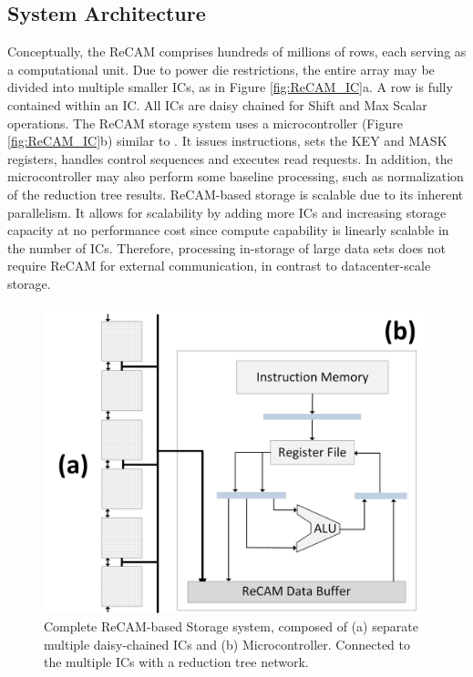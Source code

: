 \documentclass{superfri}
\begin{document}
\subsection{System Architecture}
\label{sec:system_architecture}
Conceptually, the ReCAM comprises hundreds of millions of rows, each serving as a computational unit. Due to power die restrictions, the entire array may be divided into multiple smaller ICs, as in Figure \ref{fig:ReCAM_IC}a. A row is fully contained within an IC. All ICs are daisy chained for Shift and Max Scalar operations.
The ReCAM storage system uses a microcontroller (Figure \ref{fig:ReCAM_IC}b) similar to \cite{guo2013ac}. It issues instructions, sets the KEY and MASK registers, handles control sequences and executes read requests. In addition, the microcontroller may also perform some baseline processing, such as normalization of the reduction tree results.
ReCAM-based storage is scalable due to its inherent parallelism. It allows for scalability by adding more ICs and increasing storage capacity at no performance cost since compute capability is linearly scalable in the number of ICs. Therefore, processing in-storage of large data sets does not require ReCAM for external communication, in contrast to datacenter-scale storage. 

\begin{figure}[h!]
	\centerline{\includegraphics[scale=0.6]{Figures/ReCAM_Single_IC_Column.jpg}}
	\caption{Complete ReCAM-based Storage system, composed of (a) separate multiple daisy-chained ICs and (b) Microcontroller. Connected to the multiple ICs with a reduction tree network.}
	\label{fig:ReCAM_system}
\end{figure}
\end{document}
